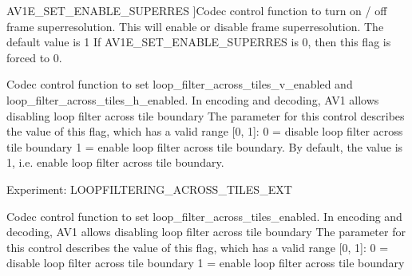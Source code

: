 \begin{Desc}
\begin{description}
{A\+V1\+E\+\_\+\+S\+E\+T\+\_\+\+E\+N\+A\+B\+L\+E\+\_\+\+S\+U\+P\+E\+R\+R\+ES\hypertarget{group__aom__encoder_ggae78dde67a6d78f332e9bdba0dde42db5a86e399de03aa825bb7e594e3df1bf71b}{}\label{group__aom__encoder_ggae78dde67a6d78f332e9bdba0dde42db5a86e399de03aa825bb7e594e3df1bf71b}
}]Codec control function to turn on / off frame superresolution. This will enable or disable frame superresolution. The default value is 1 If A\+V1\+E\+\_\+\+S\+E\+T\+\_\+\+E\+N\+A\+B\+L\+E\+\_\+\+S\+U\+P\+E\+R\+R\+ES is 0, then this flag is forced to 0. \item[{\em 
A\+V1\+E\+\_\+\+S\+E\+T\+\_\+\+T\+I\+L\+E\+\_\+\+L\+O\+O\+P\+F\+I\+L\+T\+E\+R\+\_\+V\hypertarget{group__aom__encoder_ggae78dde67a6d78f332e9bdba0dde42db5a6a0840616f415ca99cd44254dbbb6e96}{}\label{group__aom__encoder_ggae78dde67a6d78f332e9bdba0dde42db5a6a0840616f415ca99cd44254dbbb6e96}
}]Codec control function to set loop\+\_\+filter\+\_\+across\+\_\+tiles\+\_\+v\+\_\+enabled and loop\+\_\+filter\+\_\+across\+\_\+tiles\+\_\+h\+\_\+enabled. In encoding and decoding, A\+V1 allows disabling loop filter across tile boundary The parameter for this control describes the value of this flag, which has a valid range \mbox{[}0, 1\mbox{]}\+: 0 = disable loop filter across tile boundary 1 = enable loop filter across tile boundary. By default, the value is 1, i.\+e. enable loop filter across tile boundary.

Experiment\+: L\+O\+O\+P\+F\+I\+L\+T\+E\+R\+I\+N\+G\+\_\+\+A\+C\+R\+O\+S\+S\+\_\+\+T\+I\+L\+E\+S\+\_\+\+E\+XT \item[{\em 
A\+V1\+E\+\_\+\+S\+E\+T\+\_\+\+T\+I\+L\+E\+\_\+\+L\+O\+O\+P\+F\+I\+L\+T\+ER\hypertarget{group__aom__encoder_ggae78dde67a6d78f332e9bdba0dde42db5ad73c1279b456a8296686695c1949eb97}{}\label{group__aom__encoder_ggae78dde67a6d78f332e9bdba0dde42db5ad73c1279b456a8296686695c1949eb97}
}]Codec control function to set loop\+\_\+filter\+\_\+across\+\_\+tiles\+\_\+enabled. In encoding and decoding, A\+V1 allows disabling loop filter across tile boundary The parameter for this control describes the value of this flag, which has a valid range \mbox{[}0, 1\mbox{]}\+: 0 = disable loop filter across tile boundary 1 = enable loop filter across tile boundary


\end{description}
\end{Desc}

